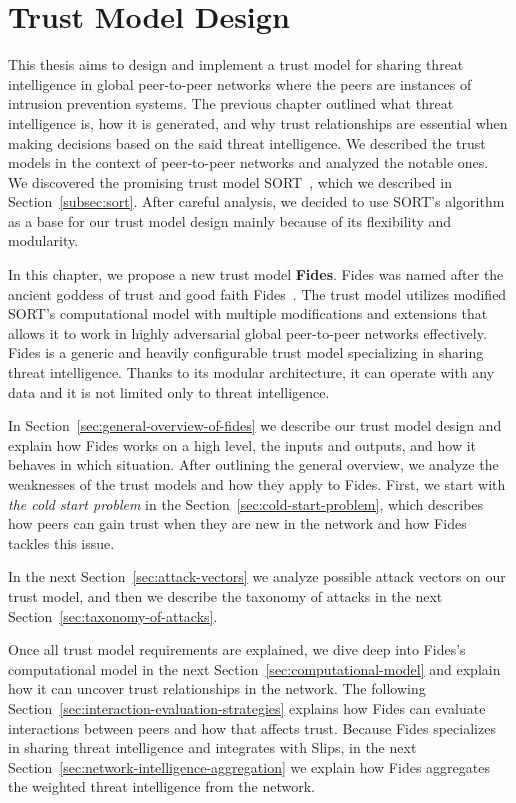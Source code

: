 \chapter{Trust Model Design}
\label{ch:trust-model-design}
This thesis aims to design and implement a trust model for sharing threat intelligence in global peer-to-peer networks where the peers are instances of intrusion prevention systems.
The previous chapter outlined what threat intelligence is, how it is generated, and why trust relationships are essential when making decisions based on the said threat intelligence.
We described the trust models in the context of peer-to-peer networks and analyzed the notable ones.
We discovered the promising trust model SORT~\cite{sort}, which we described in Section~\ref{subsec:sort}. After careful analysis, we decided to use SORT's algorithm as a base for our trust model design mainly because of its flexibility and modularity.

In this chapter, we propose a new trust model \textbf{Fides}.
Fides was named after the ancient goddess of trust and good faith Fides~\cite{enwiki:1086924565}.
The trust model utilizes modified SORT's computational model with multiple modifications and extensions that allows it to work in highly adversarial global peer-to-peer networks effectively.
Fides is a generic and heavily configurable trust model specializing in sharing threat intelligence.
Thanks to its modular architecture, it can operate with any data and it is not limited only to threat intelligence.

In Section~\ref{sec:general-overview-of-fides} we describe our trust model design and explain how Fides works on a high level, the inputs and outputs, and how it behaves in which situation. After outlining the general overview, we analyze the weaknesses of the trust models and how they apply to Fides.
First, we start with \textit{the cold start problem} in the Section~\ref{sec:cold-start-problem}, which describes how peers can gain trust when they are new in the network and how Fides tackles this issue.

In the next Section~\ref{sec:attack-vectors} we analyze possible attack vectors on our trust model, and then we describe the taxonomy of attacks in the next Section~\ref{sec:taxonomy-of-attacks}.

Once all trust model requirements are explained, we dive deep into Fides's computational model in the next Section~\ref{sec:computational-model}  and explain how it can uncover trust relationships in the network.
The following Section~\ref{sec:interaction-evaluation-strategies} explains how Fides can evaluate interactions between peers and how that affects trust.
Because Fides specializes in sharing threat intelligence and integrates with Slips, in the next Section~\ref{sec:network-intelligence-aggregation} we explain how Fides aggregates the weighted threat intelligence from the network.

